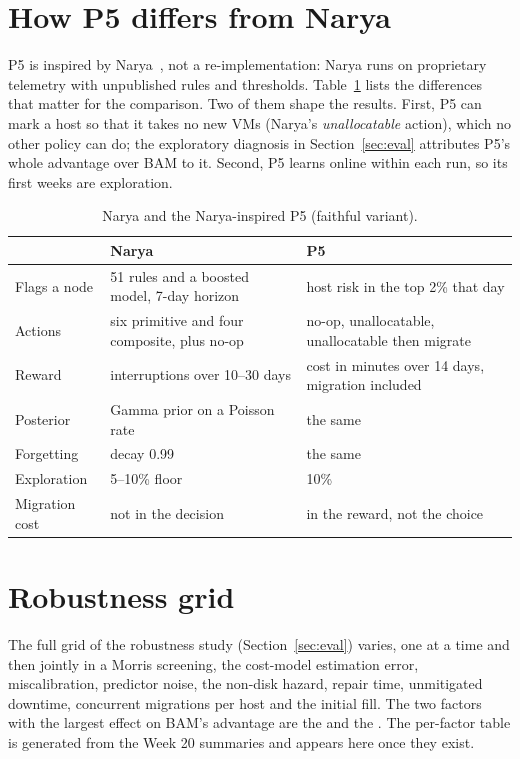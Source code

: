 \section{How P5 differs from Narya}
\label{app:narya}
P5 is inspired by Narya~\cite{levy2020narya}, not a re-implementation: Narya runs on proprietary
telemetry with unpublished rules and thresholds. Table~\ref{tab:narya} lists the differences that
matter for the comparison. Two of them shape the results. First, P5 can mark a host so that it
takes no new VMs (Narya's \emph{unallocatable} action), which no other policy can do; the
exploratory diagnosis in Section~\ref{sec:eval} attributes P5's whole advantage over BAM to it.
Second, P5 learns online within each run, so its first weeks are exploration.

\begin{table}[h]
  \centering\small
  \caption{Narya and the Narya-inspired P5 (faithful variant).}
  \label{tab:narya}
  \begin{tabular}{p{}p{}p{}}
    \toprule
    & Narya & P5 \\
    \midrule
    Flags a node & 51 rules and a boosted model, 7-day horizon & host risk in the top 2\% that day \\
    Actions & six primitive and four composite, plus no-op & no-op, unallocatable, unallocatable then migrate \\
    Reward & interruptions over 10--30 days & cost in minutes over 14 days, migration included \\
    Posterior & Gamma prior on a Poisson rate & the same \\
    Forgetting & decay 0.99 & the same \\
    Exploration & 5--10\% floor & 10\% \\
    Migration cost & not in the decision & in the reward, not the choice \\
    \bottomrule
  \end{tabular}
\end{table}

\section{Robustness grid}
\label{app:robust}
The full grid of the robustness study (Section~\ref{sec:eval}) varies, one at a time and then
jointly in a Morris screening, the cost-model estimation error, miscalibration, predictor noise,
the non-disk hazard, repair time, unmitigated downtime, concurrent migrations per host and the
initial fill. The two factors with the largest effect on BAM's advantage are the
\VMorrisTopFactor{} and the \VMorrisSecondFactor. The per-factor table is generated from the
Week 20 summaries and appears here once they exist.
